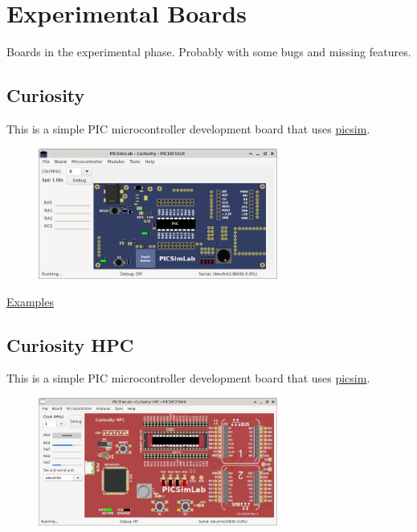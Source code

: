 \chapter{Experimental Boards} \hypertarget{def:eboards}{}

Boards in the experimental phase. Probably with some bugs and missing features. 

\section{Curiosity }

This is a simple PIC microcontroller development board that uses \href{https://github.com/lcgamboa/picsim}{picsim}.

\begin{figure}[H]
\center
\includegraphics[width=0.7\textwidth]{img/Curiosity.png} 
\end{figure} 

\href{https://lcgamboa.github.io/picsimlab_examples/board_Curiosity.html}{Examples}

\section{Curiosity HPC}

This is a simple PIC microcontroller development board that uses \href{https://github.com/lcgamboa/picsim}{picsim}.

\begin{figure}[H]
\center
\includegraphics[width=0.7\textwidth]{img/Curiosity_HPC.png} 
\end{figure} 

